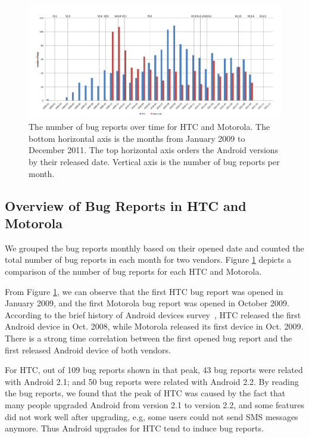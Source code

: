 \documentclass[10pt, conference, compsocconf]{IEEEtran}
\begin{document}
\begin{figure}
\centering
\includegraphics[width=1\textwidth]{bugovertime.png}
\caption{The number of bug reports over time for HTC and Motorola. The
  bottom
  horizontal axis is the months from January 2009 to December 2011. The top
  horizontal axis orders the Android versions by their released
  date. Vertical axis is the number of bug reports per month.}
\label{bugovertime}
\end{figure}

\subsection{Overview of Bug Reports in HTC and Motorola}

We grouped the bug reports monthly based on their opened date and
counted the total number of bug reports in each month for two
vendors. 
Figure \ref{bugovertime} depicts a comparison of the number
of bug reports for each HTC and Motorola.


From Figure \ref{bugovertime}, we can observe that the first HTC bug
report was opened in January 2009, and the first Motorola bug report
was opened in October 2009.
According to the brief history of Android devices
survey~\cite{historyofandroid}, HTC released the first Android device
in Oct. 2008, while Motorola released its first device in Oct. 2009.
There is a strong time correlation between the first
opened bug report and the first released Android device of both
vendors.


For HTC, out of 109 bug reports shown in that peak, 43 bug reports
were related with Android 2.1;
 and 50 bug reports were related with Android 2.2. 
By reading the bug reports, we found that the peak of HTC was caused
by the fact that many people upgraded Android from version 2.1 to
version 2.2,
and some features did not work well after upgrading, e.g, some users
could not send SMS messages anymore.
Thus Android upgrades for HTC tend to induce bug reports.
\end{document}
